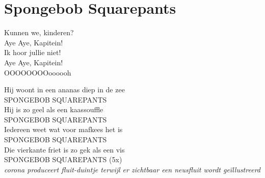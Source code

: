 \section{Spongebob Squarepants}
Kunnen we, kinderen?\\
Aye Aye, Kapitein!\\
Ik hoor jullie niet!\\
Aye Aye, Kapitein!\\
OOOOOOOOoooooh

Hij woont in een ananas diep in de zee\\
SPONGEBOB SQUAREPANTS\\
Hij is zo geel als een kaassouffle\\
SPONGEBOB SQUAREPANTS\\
Iedereen weet wat voor mafkees het is\\
SPONGEBOB SQUAREPANTS\\
Die vierkante friet is zo gek als een vis\\
SPONGEBOB SQUAREPANTS (5x)\\
\textit{corona produceert fluit-duintje terwijl er zichtbaar een neusfluit wordt geïllustreerd}

